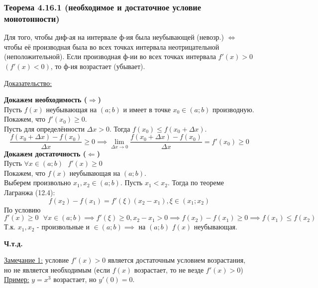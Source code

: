 \documentclass[12pt]{article}
\begin{document}
    \subsubsection*{Теорема 4.16.1 (необходимое и достаточное условие монотонности)}\label{th:4.16.1}
    Для того, чтобы диф-ая на интервале ф-ия была неубывающей (невозр.) $\Longleftrightarrow$ чтобы её производная была во всех точках интервала неотрицательной (неположительной).
    Если производная ф-ии во всех точках интервала $f'(x) > 0$ $(f'(x) < 0)$, то ф-ия возрастает (убывает).\par\noindent
    \underline{Доказательство:}
    \begin{adjustwidth}{1.5em}{1.5em}
        \textbf{Докажем необходимость ($\Rightarrow$)}\\
        Пусть $f(x)$ неубывающая на $(a; b)$ и имеет в точке $x_0 \in (a; b)$ производную.\\
        Покажем, что $f'(x_0) \ge 0$.\\
        Пусть для определённости $\Delta x > 0$. Тогда $f(x_0) \le f(x_0 + \Delta x)$.
        \[ \frac{f(x_0 + \Delta x) - f(x_0)}{\Delta x} \ge 0 \implies \lim_{\Delta x \to 0} \frac{f(x_0 + \Delta x) - f(x_0)}{\Delta x} = f'(x_0) \ge 0 \]\noindent
        \textbf{Докажем достаточность ($\Leftarrow$)}\\
        Пусть $\forall x \in (a; b) \text{ } f'(x) \ge 0$\\
        Покажем, что $f(x)$ неубывающая на $(a;b)$.\\
        Выберем произвольно $x_1, x_2 \in (a; b)$. Пусть $x_1 < x_2$. Тогда по теореме Лагранжа (12.4):
        \[ f(x_2) - f(x_1) = f'(\xi)(x_2-x_1), \xi \in (x_1; x_2) \]
        По условию \[f'(x) \ge 0 \text{ } \forall x \in (a; b) \implies f'(\xi) \ge 0, x_2 - x_1 > 0 \implies f(x_2) - f(x_1) \ge 0 \implies f(x_1) \le f(x_2)\]
        Т.к. $x_1, x_2$ - произвольные и $\in (a; b) \implies$ на $(a;b)$ $f(x)$ неубывающая.
        \begin{center}
            \textbf{Ч.т.д.}
        \end{center}
    \end{adjustwidth}
    \underline{Замечание 1:} условие $f'(x) > 0$ является достаточным условием возрастания, но не является необходимым (если $f(x)$ возрастает, то не везде $f'(x) > 0$)\\
    \underline{Пример:} $y = x^3$ возрастает, но $y'(0) = 0$.
\end{document}
